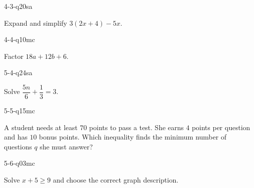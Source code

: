 \begin{practiceQuestion}{4-3-q20}{sa}
\begin{questionText}
Expand and simplify $3(2x + 4) - 5x$.
\end{questionText}
\end{practiceQuestion}

\begin{practiceQuestion}{4-4-q10}{mc}
\begin{questionText}
Factor $18a + 12b + 6$.
\end{questionText}
\end{practiceQuestion}

\begin{practiceQuestion}{5-4-q24}{sa}
\begin{questionText}
Solve $\dfrac{5n}{6} + \dfrac{1}{3} = 3$.
\end{questionText}
\end{practiceQuestion}

\begin{practiceQuestion}{5-5-q15}{mc}
\begin{questionText}
A student needs at least $70$ points to pass a test. She earns $4$ points per question and has $10$ bonus points. Which inequality finds the minimum number of questions $q$ she must answer?
\end{questionText}
\end{practiceQuestion}

\begin{practiceQuestion}{5-6-q03}{mc}
\begin{questionText}
Solve $x + 5 \geq 9$ and choose the correct graph description.
\end{questionText}
\end{practiceQuestion}

